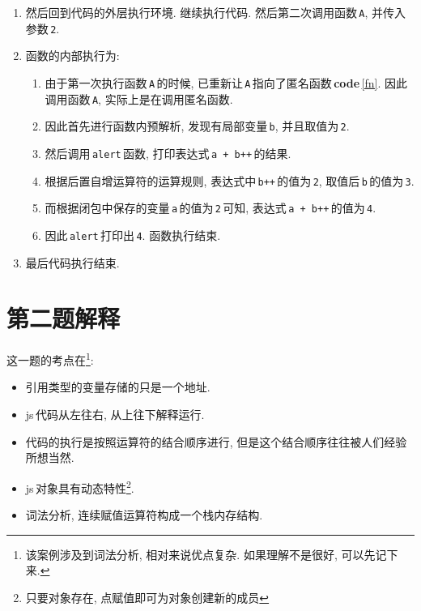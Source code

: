 \documentclass[UTF8, noindent]{ctexart}
\renewcommand{\lstlistingname}{{\footnotesize\bfseries code}}
\newcommand{\coderef}[1]{\lstlistingname\,\ref{#1}}
\begin{document}
\begin{enumerate}
\item 然后回到代码的外层执行环境. 继续执行代码. 然后第二次调用函数\,\lstinline|A|, 并传入参数\,\lstinline|2|.

\item 函数的内部执行为:

    \begin{enumerate}
    \item 由于第一次执行函数\,\lstinline|A|\,的时候, 已重新让\,\lstinline|A|\,指向了匿名函数\,\coderef{fn}. 因此调用函数\,\lstinline|A|,
          实际上是在调用匿名函数.
    \item 因此首先进行函数内预解析, 发现有局部变量\,\lstinline|b|, 并且取值为\,\lstinline|2|.
    \item 然后调用\,\lstinline|alert|\,函数, 打印表达式\,\lstinline|a + b++|\,的结果.
    \item 根据后置自增运算符的运算规则, 表达式中\,\lstinline|b++|\,的值为\,\lstinline|2|, 取值后\,\lstinline|b|\,的值为\,\lstinline|3|.
    \item 而根据闭包中保存的变量\,\lstinline|a|\,的值为\,\lstinline|2|\,可知, 表达式\,\lstinline|a + b++|\,的值为\,\lstinline|4|.
    \item 因此\,\lstinline|alert|\,打印出\,\lstinline|4|. 函数执行结束.
    \end{enumerate}

\item 最后代码执行结束.

\end{enumerate}



\section{第二题解释}

这一题的考点在\footnote{该案例涉及到词法分析, 相对来说优点复杂. 如果理解不是很好, 可以先记下来.}:

\begin{itemize}
\item 引用类型的变量存储的只是一个地址.
\item js\,代码从左往右, 从上往下解释运行.
\item 代码的执行是按照运算符的结合顺序进行, 但是这个结合顺序往往被人们经验所想当然.
\item js\,对象具有动态特性\footnote{只要对象存在, 点赋值即可为对象创建新的成员}.
\item 词法分析, 连续赋值运算符构成一个栈内存结构.
\end{itemize}
\end{document}
